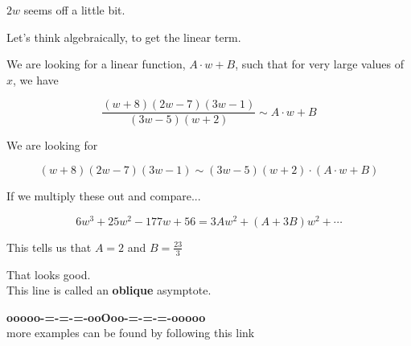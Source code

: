 \documentclass{ximera}
\begin{document}
\begin{center}
\end{center}



$2w$ seems off a little bit. 


Let's think algebraically, to get the linear term. 



We are looking for a linear function, $A \cdot w + B$, such that for very large values of $x$, we have










\[ \frac{(w+8)(2w-7)(3w-1)}{(3w-5)(w+2)}    \sim    A \cdot w + B  \]




We are looking for 



\[ (w+8)(2w-7)(3w-1)   \sim   (3w-5)(w+2) \cdot  (A \cdot w + B)  \]



If we multiply these out and compare...


\[
6 w^3 + 25 w^2 - 177 w + 56 = 3A w^2 + (A + 3B) w^2 + \cdots
\]


This tells us that $A = 2$ and $B = \frac{23}{3}$




\begin{center}
\end{center}


That looks good.  \\

This line is called an \textbf{oblique} asymptote.





















\begin{onlineOnly}
\begin{center}
\textbf{\textcolor{green!50!black}{ooooo-=-=-=-ooOoo-=-=-=-ooooo}} \\

more examples can be found by following this link\\ 

\end{center}
\end{onlineOnly}
\end{document}
